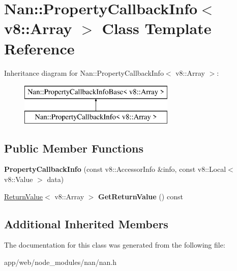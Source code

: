 \hypertarget{class_nan_1_1_property_callback_info_3_01v8_1_1_array_01_4}{}\section{Nan\+:\+:Property\+Callback\+Info$<$ v8\+:\+:Array $>$ Class Template Reference}
\label{class_nan_1_1_property_callback_info_3_01v8_1_1_array_01_4}
Inheritance diagram for Nan\+:\+:Property\+Callback\+Info$<$ v8\+:\+:Array $>$\+:\begin{figure}[H]
\begin{center}
\leavevmode
\includegraphics[height=2.000000cm]{class_nan_1_1_property_callback_info_3_01v8_1_1_array_01_4}
\end{center}
\end{figure}
\subsection*{Public Member Functions}
\begin{DoxyCompactItemize}
\item 
\mbox{\label{class_nan_1_1_property_callback_info_3_01v8_1_1_array_01_4_a7fb84c9809234a8cbb62218439cd4aae}} 
{\bfseries Property\+Callback\+Info} (const v8\+::\+Accessor\+Info \&info, const v8\+::\+Local$<$ v8\+::\+Value $>$ data)
\item 
\mbox{\label{class_nan_1_1_property_callback_info_3_01v8_1_1_array_01_4_a23a8e9809baf02fd110d75e6c982e2aa}} 
\hyperlink{class_nan_1_1_return_value}{Return\+Value}$<$ v8\+::\+Array $>$ {\bfseries Get\+Return\+Value} () const
\end{DoxyCompactItemize}
\subsection*{Additional Inherited Members}


The documentation for this class was generated from the following file\+:\begin{DoxyCompactItemize}
\item 
app/web/node\+\_\+modules/nan/nan.\+h\end{DoxyCompactItemize}
